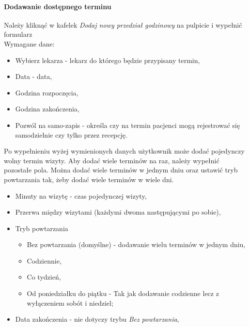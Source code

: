 \documentclass[polish,12pt]{aghthesis}
\begin{document}
    \paragraph{Dodawanie dostępnego terminu}{
        Należy kliknąć w kafelek \emph{Dodaj nowy przedział godzinowy} na pulpicie i wypełnić formularz \\
        Wymagane dane:
        \begin{itemize}
            \item Wybierz lekarza - lekarz do którego będzie przypisany termin,
            \item Data - data,
            \item Godzina rozpoczęcia,
            \item Godzina zakończenia,
            \item Pozwól na samo-zapis - określa czy na termin pacjenci mogą rejestrować się samodzielnie czy tylko przez recepcję.
        \end{itemize}
        Po wypełnieniu wyżej wymienionych danych użytkownik może dodać pojedynczy wolny termin wizyty. Aby dodać wiele terminów na raz, należy wypełnić pozostałe pola. Można dodać wiele terminów  w jednym dniu oraz ustawić tryb powtarzania tak, żeby dodać wiele terminów w wiele dni.
        \begin{itemize}
            \item Minuty na wizytę - czas pojedynczej wizyty,
            \item Przerwa między wizytami (każdymi dwoma następującymi po sobie),
            \item Tryb powtarzania \begin{itemize}
                \item Bez powtarzania (domyślne) - dodawanie wielu terminów w jednym dniu,
                \item Codziennie,
                \item Co tydzień,
                \item Od poniedziałku do piątku - Tak jak dodawanie codzienne lecz z wyłączeniem sobót i niedziel;
            \end{itemize}
            \item Data zakończenia - nie dotyczy trybu \emph{Bez powtarzania},
        \end{itemize}
        \begin{figure}[H]

\end{figure}}
\end{document}
